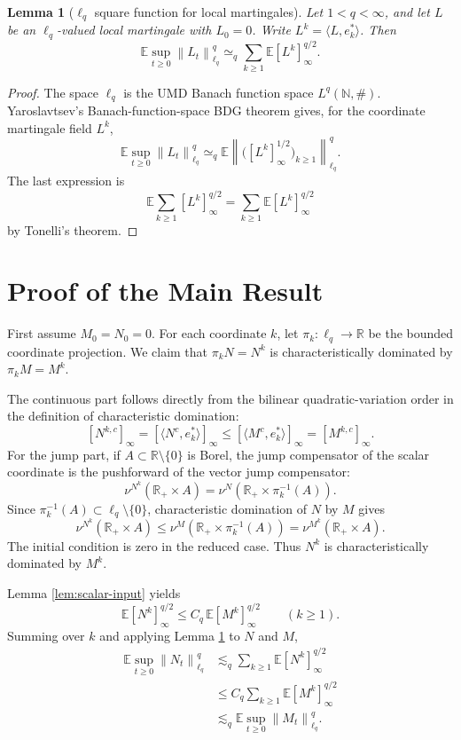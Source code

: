 \documentclass[11pt]{article}
\newtheorem{lemma}{Lemma}
\newcommand{\E}{\mathbb E}
\newcommand{\R}{\mathbb R}
\newcommand{\norm}[1]{\left\lVert #1\right\rVert}
\newcommand{\simequiv}{\simeq}
\begin{document}
\begin{lemma}[\(\ell_q\) square function for local martingales]
\label{lem:ellq-bdg}
Let \(1<q<\infty\), and let \(L\) be an \(\ell_q\)-valued local martingale
with \(L_0=0\).  Write \(L^k=\langle L,e_k^*\rangle\).  Then
\[
  \E\sup_{t\ge0}\norm{L_t}_{\ell_q}^{q}
  \simequiv_q
  \sum_{k\ge1} \E [L^k]_\infty^{q/2}.
\]
\end{lemma}

\begin{proof}
The space \(\ell_q\) is the UMD Banach function space
\(L^q(\mathbb N,\#)\).  Yaroslavtsev's Banach-function-space BDG theorem
\cite[Theorem 5.9]{Yaroslavtsev2018} gives, for the coordinate martingale
field \(L^k\),
\[
  \E\sup_{t\ge0}\norm{L_t}_{\ell_q}^{q}
  \simequiv_q
  \E \left\|\bigl([L^k]_\infty^{1/2}\bigr)_{k\ge1}\right\|_{\ell_q}^{q}.
\]
The last expression is
\[
  \E \sum_{k\ge1} [L^k]_\infty^{q/2}
  =
  \sum_{k\ge1} \E [L^k]_\infty^{q/2}
\]
by Tonelli's theorem.
\end{proof}

\section*{Proof of the Main Result}

First assume \(M_0=N_0=0\).  For each coordinate \(k\), let
\(\pi_k:\ell_q\to\R\) be the bounded coordinate projection.  We claim that
\(\pi_kN=N^k\) is characteristically dominated by \(\pi_kM=M^k\).

The continuous part follows directly from the bilinear quadratic-variation
order in the definition of characteristic domination:
\[
   [N^{k,c}]_\infty
   =
   [\langle N^c,e_k^*\rangle]_\infty
   \leq
   [\langle M^c,e_k^*\rangle]_\infty
   =
   [M^{k,c}]_\infty .
\]
For the jump part, if \(A\subset\R\setminus\{0\}\) is Borel, the jump
compensator of the scalar coordinate is the pushforward of the vector jump
compensator:
\[
   \nu^{N^k}(\R_+\times A)
   =
   \nu^N(\R_+\times \pi_k^{-1}(A)).
\]
Since \(\pi_k^{-1}(A)\subset \ell_q\setminus\{0\}\), characteristic domination
of \(N\) by \(M\) gives
\[
   \nu^{N^k}(\R_+\times A)
   \leq
   \nu^M(\R_+\times \pi_k^{-1}(A))
   =
   \nu^{M^k}(\R_+\times A).
\]
The initial condition is zero in the reduced case.  Thus \(N^k\) is
characteristically dominated by \(M^k\).

Lemma \ref{lem:scalar-input} yields
\[
  \E [N^k]_\infty^{q/2}
  \leq
  C_q\,\E [M^k]_\infty^{q/2}
  \qquad(k\ge1).
\]
Summing over \(k\) and applying Lemma \ref{lem:ellq-bdg} to \(N\) and \(M\),
\[
\begin{aligned}
  \E\sup_{t\ge0}\norm{N_t}_{\ell_q}^{q}
  &\lesssim_q
  \sum_{k\ge1}\E [N^k]_\infty^{q/2} \\
  &\leq
  C_q\sum_{k\ge1}\E [M^k]_\infty^{q/2} \\
  &\lesssim_q
  \E\sup_{t\ge0}\norm{M_t}_{\ell_q}^{q}.
\end{aligned}
\]
\end{document}
